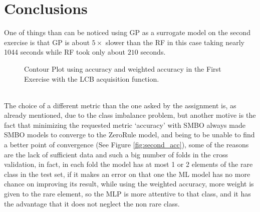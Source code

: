 \documentclass[12pt, onecolumn]{article}
\begin{document}
\section*{Conclusions}
One of things than can be noticed using GP as a surrogate model on the second exercise is that GP is about $5\times$ slower than the RF in this case taking nearly 1044 seconds while RF took only about $210$ seconds.
\begin{figure}[!h]
  \centering
  \caption{Contour Plot using accuracy and weighted accuracy in the First Exercise with the LCB acquisition function.}
  \label{fig:contour}
\end{figure}\\
The choice of a different metric than the one asked by the assignment is, as already mentioned, due to the class imbalance problem, but another motive is the fact that minimizing the requested metric `accuracy' with SMBO always made SMBO models to converge to the ZeroRule model, and being to be unable to find a better point of convergence (See Figure \ref{fig:second_acc}), some of the reasons are the lack of sufficient data and such a big number of folds in the cross validation, in fact, in each fold the model has at most 1 or 2 elements of the rare class in the test set, if it makes an error on that one the ML model has no more chance on improving its result, while using the weighted accuracy, more weight is given to the rare element, so the MLP is more attentive to that class, and it has the advantage that it does not neglect the non rare class.\\
\end{document}
